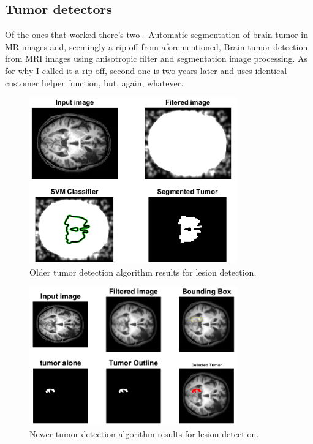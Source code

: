 \documentclass[12pt]{article}
\begin{document}
\subsection{Tumor detectors}
\label{ssec:tumors}

Of the ones that worked there’s two - Automatic segmentation of brain tumor in MR images\cite{matlabTumor} and, seemingly a rip-off from aforementioned, Brain tumor detection from MRI images using anisotropic filter and segmentation image processing\cite{matlabTumor2}. As for why I called it a rip-off, second one is two years later and uses identical customer helper function, but, again, whatever.

\begin{figure}[!htb]
\centering
\includegraphics[width=0.8\textwidth]{img/tumor2}
\caption{Older tumor detection algorithm\cite{matlabTumor} results for lesion detection.}
\label{fig:tumor1}
\end{figure}

\begin{figure}[!htb]
\centering
\includegraphics[width=0.8\textwidth]{img/tumerFull}
\caption{Newer tumor detection algorithm\cite{matlabTumor2} results for lesion detection.}
\label{fig:tumor2}
\end{figure}
\end{document}
